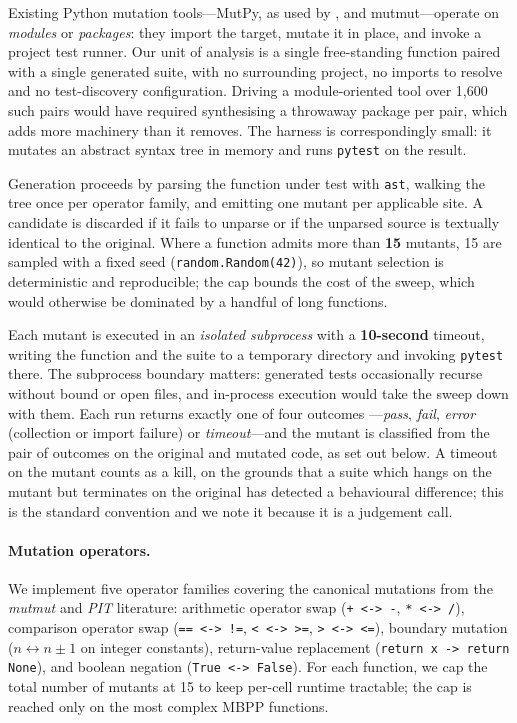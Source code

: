 \documentclass[smallextended]{svjour3}
\begin{document}
Existing Python mutation tools---MutPy, as used by
\citet{dakhel2024mutation}, and mutmut---operate on \emph{modules} or
\emph{packages}: they import the target, mutate it in place, and
invoke a project test runner. Our unit of analysis is a single
free-standing function paired with a single generated suite, with no
surrounding project, no imports to resolve and no test-discovery
configuration. Driving a module-oriented tool over 1{,}600 such pairs
would have required synthesising a throwaway package per pair, which
adds more machinery than it removes. The harness is correspondingly
small: it mutates an abstract syntax tree in memory and runs
\texttt{pytest} on the result.

Generation proceeds by parsing the function under test with
\texttt{ast}, walking the tree once per operator family, and emitting
one mutant per applicable site. A candidate is discarded if it fails
to unparse or if the unparsed source is textually identical to the
original. Where a function admits more than
\textbf{15} mutants, 15 are sampled with a fixed seed
(\texttt{random.Random(42)}), so mutant selection is deterministic
and reproducible; the cap bounds the cost of the sweep, which would
otherwise be dominated by a handful of long functions.

Each mutant is executed in an \emph{isolated subprocess} with a
\textbf{10-second} timeout, writing the function and the suite to a
temporary directory and invoking \texttt{pytest} there. The
subprocess boundary matters: generated tests occasionally recurse
without bound or open files, and in-process execution would take the
sweep down with them. Each run returns exactly one of four outcomes
---\emph{pass}, \emph{fail}, \emph{error} (collection or import
failure) or \emph{timeout}---and the mutant is classified from the
pair of outcomes on the original and mutated code, as set out below.
A timeout on the mutant counts as a kill, on the grounds that a
suite which hangs on the mutant but terminates on the original has
detected a behavioural difference; this is the standard convention
and we note it because it is a judgement call.

\paragraph{Mutation operators.}
We implement five operator families covering the canonical mutations
from the \emph{mutmut} and \emph{PIT} literature: arithmetic
operator swap (\verb|+ <-> -|, \verb|* <-> /|), comparison operator
swap (\verb|== <-> !=|, \verb|< <-> >=|, \verb|> <-> <=|), boundary
mutation ($n \leftrightarrow n \pm 1$ on integer constants),
return-value replacement (\verb|return x -> return None|), and
boolean negation (\verb|True <-> False|). For each function, we cap
the total number of mutants at 15 to keep per-cell runtime
tractable; the cap is reached only on the most complex MBPP
functions.
\end{document}
